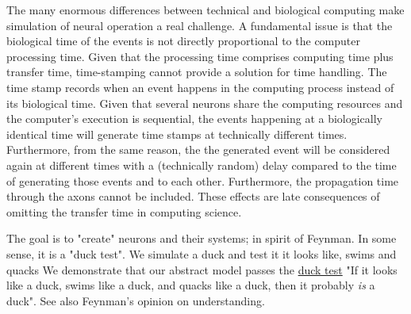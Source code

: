 

	The many enormous differences between technical and biological computing make simulation of neural operation  a real challenge.
A fundamental issue is that the biological 
time of the events is not directly proportional to the
computer processing time. Given that the processing time
comprises computing time plus transfer time, time-stamping
cannot provide a solution for time handling. The time stamp records when an event happens in the computing process instead
of its biological time. Given that several neurons
share the computing resources and the computer's execution is sequential,
the events happening at a biologically identical time will generate time stamps at technically different times.
Furthermore, from the same reason, the the generated event
will be considered again at different times with a (technically random) delay compared to the time of generating those events and to each other.
Furthermore, the propagation time through the axons
cannot be included. 
These effects are late consequences of omitting the transfer
time in computing science. 

The goal is to "create" neurons and their systems; in spirit of Feynman. In some sense, it is a "duck test". We simulate a duck and test it it looks like, swims and quacks
We demonstrate that our abstract model passes the \href{https://en.wikipedia.org/wiki/Duck_test}{duck test}
"If it looks like a duck, swims like a duck, and quacks like a duck,
then it probably \textit{is} a duck".
See also Feynman's opinion on understanding. 
